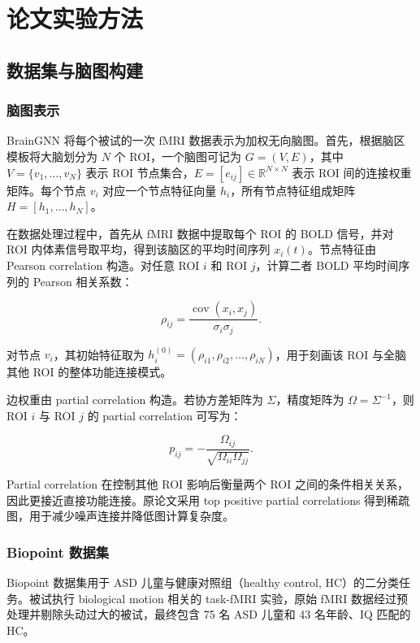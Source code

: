 \chapter{论文实验方法}

\section{数据集与脑图构建}

\subsection{脑图表示}

BrainGNN 将每个被试的一次 fMRI 数据表示为加权无向脑图。首先，根据脑区模板将大脑划分为 $N$ 个 ROI，一个脑图可记为 $G=(V,E)$，其中 $V=\{v_1,\dots,v_N\}$ 表示 ROI 节点集合，$E=[e_{ij}]\in\mathbb{R}^{N\times N}$ 表示 ROI 间的连接权重矩阵。每个节点 $v_i$ 对应一个节点特征向量 $h_i$，所有节点特征组成矩阵 $H=[h_1,\dots,h_N]$。

在数据处理过程中，首先从 fMRI 数据中提取每个 ROI 的 BOLD 信号，并对 ROI 内体素信号取平均，得到该脑区的平均时间序列 $x_i(t)$。节点特征由 Pearson correlation 构造。对任意 ROI $i$ 和 ROI $j$，计算二者 BOLD 平均时间序列的 Pearson 相关系数：

\begin{equation}
  \rho_{ij}
  =
  \frac{\operatorname{cov}(x_i,x_j)}
  {\sigma_i\sigma_j}.
\end{equation}

对节点 $v_i$，其初始特征取为 $h_i^{(0)}=(\rho_{i1},\rho_{i2},\dots,\rho_{iN})$，用于刻画该 ROI 与全脑其他 ROI 的整体功能连接模式。

边权重由 partial correlation 构造。若协方差矩阵为 $\Sigma$，精度矩阵为 $\Omega=\Sigma^{-1}$，则 ROI $i$ 与 ROI $j$ 的 partial correlation 可写为：

\begin{equation}
  p_{ij}
  =
  -\frac{\Omega_{ij}}
  {\sqrt{\Omega_{ii}\Omega_{jj}}}.
\end{equation}

Partial correlation 在控制其他 ROI 影响后衡量两个 ROI 之间的条件相关关系，因此更接近直接功能连接。原论文采用 top positive partial correlations 得到稀疏图，用于减少噪声连接并降低图计算复杂度。

\subsection{Biopoint 数据集}

Biopoint 数据集用于 ASD 儿童与健康对照组（healthy control, HC）的二分类任务。被试执行 biological motion 相关的 task-fMRI 实验，原始 fMRI 数据经过预处理并剔除头动过大的被试，最终包含 75 名 ASD 儿童和 43 名年龄、IQ 匹配的 HC。

